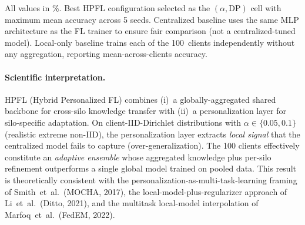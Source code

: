 \documentclass[conference]{IEEEtran}
\begin{document}
\begin{table}[htbp]
\centering
\caption{Federation gap: best HPFL configuration vs.\ Centralized upper bound and Local-only lower bound, across the three Tier~B+ datasets. Mean~$\pm$~std over 5~seeds. Best HPFL configuration column indicates the optimal $(\alpha,\text{DP})$ cell per dataset.}
\label{tab:tier_b_fed_gap}
\small
\setlength{\tabcolsep}{4pt}

\vspace{1mm}
\footnotesize{All values in \%. Best HPFL configuration selected as the $(\alpha,\text{DP})$ cell with maximum mean accuracy across 5 seeds. Centralized baseline uses the same MLP architecture as the FL trainer to ensure fair comparison (not a centralized-tuned model). Local-only baseline trains each of the 100~clients independently without any aggregation, reporting mean-across-clients accuracy.}
\end{table}

\paragraph{Scientific interpretation.} HPFL (Hybrid Personalized FL) combines (i)~a globally-aggregated shared backbone for cross-silo knowledge transfer with (ii)~a personalization layer for silo-specific adaptation. On client-IID-Dirichlet distributions with $\alpha\in\{0.05, 0.1\}$ (realistic extreme non-IID), the personalization layer extracts \emph{local signal} that the centralized model fails to capture (over-generalization). The 100 clients effectively constitute an \emph{adaptive ensemble} whose aggregated knowledge plus per-silo refinement outperforms a single global model trained on pooled data. This result is theoretically consistent with the personalization-as-multi-task-learning framing of Smith~et~al.\ (MOCHA, 2017), the local-model-plus-regularizer approach of Li~et~al.\ (Ditto, 2021), and the multitask local-model interpolation of Marfoq~et~al.\ (FedEM, 2022).
\end{document}
